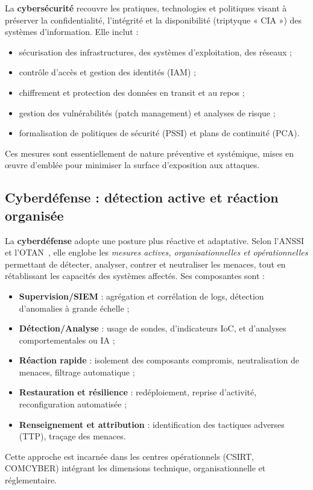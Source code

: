 \documentclass[ twoside,openright,titlepage,numbers=noenddot,headinclude,%
                footinclude=true,cleardoublepage=empty,abstractoff, %
                BCOR=5mm,paper=a4,fontsize=11pt,%
                french,american,%
                ]{scrreprt}
\begin{document}
La \textbf{cybersécurité} recouvre les pratiques, technologies et politiques visant à préserver la confidentialité, l'intégrité et la disponibilité (triptyque « CIA ») des systèmes d'information. Elle inclut :
\begin{itemize}
    \item sécurisation des infrastructures, des systèmes d'exploitation, des réseaux ;
    \item contrôle d'accès et gestion des identités (IAM) ;
    \item chiffrement et protection des données en transit et au repos ;
    \item gestion des vulnérabilités (patch management) et analyses de risque ;
    \item formalisation de politiques de sécurité (PSSI) et plans de continuité (PCA).
\end{itemize}
Ces mesures sont essentiellement de nature préventive et systémique, mises en œuvre d'emblée pour minimiser la surface d'exposition aux attaques.

\subsection*{Cyberdéfense : détection active et réaction organisée}

La \textbf{cyberdéfense} adopte une posture plus réactive et adaptative. Selon l'ANSSI et l'OTAN~\cite{ANSSI2020,NATO2016Cyberdef}, elle englobe les \emph{mesures actives, organisationnelles et opérationnelles} permettant de détecter, analyser, contrer et neutraliser les menaces, tout en rétablissant les capacités des systèmes affectés. Ses composantes sont :
\begin{itemize}
    \item \textbf{Supervision/SIEM} : agrégation et corrélation de logs, détection d'anomalies à grande échelle ;
    \item \textbf{Détection/Analyse} : usage de sondes, d'indicateurs IoC, et d'analyses comportementales ou IA ;
    \item \textbf{Réaction rapide} : isolement des composants compromis, neutralisation de menaces, filtrage automatique ;
    \item \textbf{Restauration et résilience} : redéploiement, reprise d'activité, reconfiguration automatisée ;
    \item \textbf{Renseignement et attribution} : identification des tactiques adverses (TTP), traçage des menaces.
\end{itemize}
Cette approche est incarnée dans les centres opérationnels (CSIRT, COMCYBER) intégrant les dimensions technique, organisationnelle et réglementaire.
\end{document}
